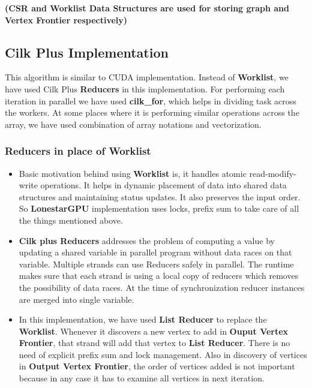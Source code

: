 \documentclass{article}
\begin{document}




\textbf{ (CSR and Worklist Data Structures are used for storing graph and Vertex Frontier respectively) }



\subsection{Cilk Plus Implementation}

This algorithm is similar to CUDA implementation. Instead of \textbf{Worklist}, we have used Cilk Plus \textbf{Reducers} in this implementation. For performing each iteration in parallel we have used \textbf{cilk\_for}, which helps in dividing task across the workers. At some places where it is performing similar operations across the array, we have used combination of array notations and vectorization. \\

\subsubsection{Reducers in place of Worklist} 

\begin{itemize}
\item Basic motivation behind using \textbf{Worklist} is, it handles atomic read-modify-write operations. It helps in dynamic placement of data into shared data structures and maintaining status updates. It also preserves the input order. So \textbf{LonestarGPU} implementation uses locks, prefix sum to take care of all the things mentioned above. \\
\item \textbf{Cilk plus Reducers} addresses the problem of computing a value by updating a shared variable in parallel program without data races on that variable. Multiple strands can use Reducers safely in parallel. The runtime makes sure that each strand is using a local copy of reducers which removes the possibility of data races. At the time of synchronization reducer instances are merged into single variable. \\
\item In this implementation, we have used \textbf{List Reducer} to replace the \textbf{Worklist}. Whenever it discovers a new vertex to add in \textbf{Ouput Vertex Frontier}, that strand will add that vertex to \textbf{List Reducer}. There is no need of explicit prefix sum and lock management. Also in discovery of vertices in \textbf{Output Vertex Frontier}, the order of vertices added is not important because in any case it has to examine all vertices in next iteration. \\
\end{itemize}
\end{document}
